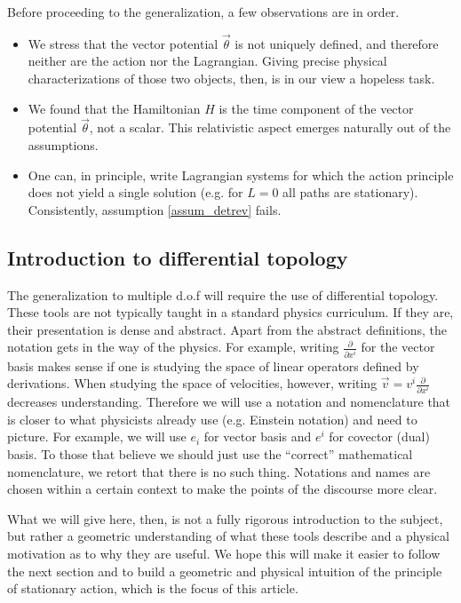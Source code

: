 \documentclass[fleqn,10pt]{wlscirep}
\begin{document}
Before proceeding to the generalization, a few observations are in order.
\begin{itemize}
	\item We stress that the vector potential $\vec{\theta}$ is not uniquely defined, and therefore neither are the action nor the Lagrangian. Giving precise physical characterizations of those two objects, then, is in our view a hopeless task.
	\item We found that the Hamiltonian $H$ is the time component of the vector potential $\vec{\theta}$, not a scalar. This relativistic aspect emerges naturally out of the assumptions.
	\item One can, in principle, write Lagrangian systems for which the action principle does not yield a single solution (e.g. for $L=0$ all paths are stationary). Consistently, assumption \ref{assum_detrev} fails.
\end{itemize}

\subsection*{Introduction to differential topology}

The generalization to multiple d.o.f will require the use of differential topology. These tools are not typically taught in a standard physics curriculum. If they are, their presentation is dense and abstract.
Apart from the abstract definitions, the notation gets in the way of the physics. For example, writing $\frac{\partial}{\partial x^i}$ for the vector basis makes sense if one is studying the space of linear operators defined by derivations. When studying the space of velocities, however, writing $\vec{v} = v^i\frac{\partial}{\partial x^i}$ decreases understanding. Therefore we will use a notation and nomenclature that is closer to what physicists already use (e.g. Einstein notation) and need to picture. For example, we will use $e_i$ for vector basis and $e^i$ for covector (dual) basis. To those that believe we should just use the ``correct'' mathematical nomenclature, we retort that there is no such thing. Notations and names are chosen within a certain context to make the points of the discourse more clear.

What we will give here, then, is not a fully rigorous introduction to the subject, but rather a geometric understanding of what these tools describe and a physical motivation as to why they are useful. We hope this will make it easier to follow the next section and to build a geometric and physical intuition of the principle of stationary action, which is the focus of this article.
\end{document}
